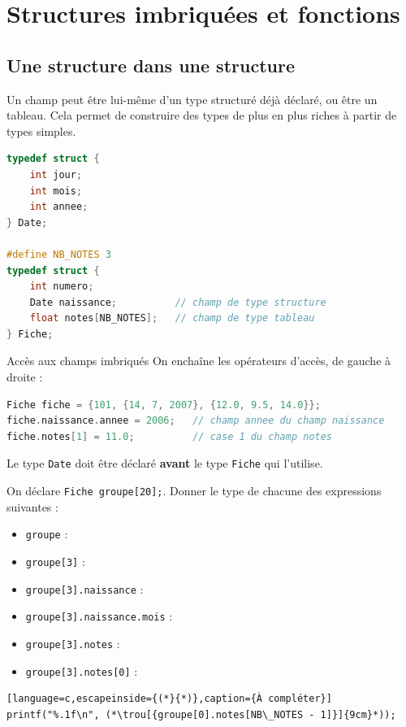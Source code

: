 \section{Structures imbriquées et fonctions}

\subsection{Une structure dans une structure}

Un champ peut être lui-même d'un type structuré déjà déclaré, ou être un tableau. Cela permet de construire des types de plus en plus riches à partir de types simples.

\begin{lstlisting}[language=c,caption={Types imbriqués},label=codeImbrique]
typedef struct {
    int jour;
    int mois;
    int annee;
} Date;

#define NB_NOTES 3
typedef struct {
    int numero;
    Date naissance;          // champ de type structure
    float notes[NB_NOTES];   // champ de type tableau
} Fiche;
\end{lstlisting}

\begin{UPSTIinfor}{Accès aux champs imbriqués}
  On enchaîne les opérateurs d'accès, de gauche à droite :
  \begin{lstlisting}[language=c,caption={Accès en cascade}]
Fiche fiche = {101, {14, 7, 2007}, {12.0, 9.5, 14.0}};
fiche.naissance.annee = 2006;   // champ annee du champ naissance
fiche.notes[1] = 11.0;          // case 1 du champ notes
\end{lstlisting}
  Le type \texttt{Date} doit être déclaré \textbf{avant} le type \texttt{Fiche} qui l'utilise.
\end{UPSTIinfor}

\begin{UPSTIactivite}
On déclare \texttt{Fiche groupe[20];}. Donner le type de chacune des expressions suivantes :
\begin{itemize}
  \item \texttt{groupe} : 
  \item \texttt{groupe[3]} : 
  \item \texttt{groupe[3].naissance} : 
  \item \texttt{groupe[3].naissance.mois} : 
  \item \texttt{groupe[3].notes} : 
  \item \texttt{groupe[3].notes[0]} : 
\end{itemize}
\begin{lstlisting}[language=c,escapeinside={(*}{*)},caption={À compléter}]
printf("%.1f\n", (*\trou[{groupe[0].notes[NB\_NOTES - 1]}]{9cm}*));
\end{lstlisting}
\end{UPSTIactivite}

